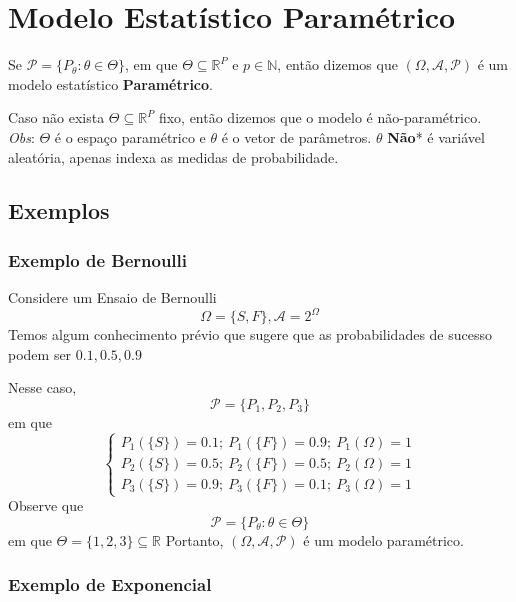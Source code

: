 \documentclass[
  letterpaper,
  DIV=11,
  numbers=noendperiod]{scrreprt}
\begin{document}
\section{Modelo Estatístico
Paramétrico}\label{modelo-estatuxedstico-paramuxe9trico}

Se \(\mathscr{P} = \{P_{\theta} : \theta \in \Theta\}\), em que
\(\Theta \subseteq \mathbb{R}^{P}\) e \(p \in \mathbb{N}\), então
dizemos que \((\Omega, \mathscr{A}, \mathscr{P})\) é um modelo
estatístico \textbf{Paramétrico}.

Caso não exista \(\Theta \subseteq \mathbb{R}^{P}\) fixo, então dizemos
que o modelo é não-paramétrico. \emph{Obs}: \(\Theta\) é o espaço
paramétrico e \(\theta\) é o vetor de parâmetros. \(\theta\)
\textbf{Não}* é variável aleatória, apenas indexa as medidas de
probabilidade.

\subsection{Exemplos}\label{exemplos}

\subsubsection{Exemplo de Bernoulli}\label{exemplo-de-bernoulli}

Considere um Ensaio de Bernoulli
\[\Omega = \{S,F \}, \mathscr{A} = 2^\Omega\] Temos algum conhecimento
prévio que sugere que as probabilidades de sucesso podem ser
\(0.1, 0.5, 0.9\)

Nesse caso, \[\mathscr{P} = \{P_{1}, P_{2}, P_{3} \}\] em que
\[\begin{cases}
P_{1}(\{S\}) = 0.1;~ P_{1}(\{F\}) = 0.9;~ P_{1}(\Omega) = 1  \\
P_{2}(\{S\}) = 0.5;~ P_{2}(\{F\}) = 0.5;~ P_{2}(\Omega) = 1  \\
P_{3}(\{S\}) = 0.9;~ P_{3}(\{F\}) = 0.1;~ P_{3}(\Omega) = 1 
\end{cases}\] Observe que
\[\mathscr{P}=\{P_{\theta}: \theta \in \Theta \}\] em que
\(\Theta=\{1,2,3 \}\subseteq \mathbb{R}\) Portanto,
\((\Omega, \mathscr{A}, \mathscr{P})\) é um modelo paramétrico.

\subsubsection{Exemplo de Exponencial}\label{exemplo-de-exponencial}
\end{document}
